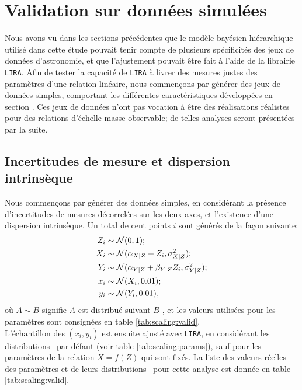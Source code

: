 \section{Validation sur données simulées}
\label{sec:scaling:valid}

Nous avons vu dans les sections précédentes que le modèle bayésien hiérarchique utilisé dans cette étude pouvait tenir compte de plusieurs spécificités des jeux de données d'astronomie, et que l'ajustement pouvait être fait à l'aide de la librairie \texttt{LIRA}.
Afin de tester la capacité de \texttt{LIRA} à livrer des mesures justes des paramètres d'une relation linéaire, nous commençons par générer des jeux de données simples, comportant les différentes caractéristiques développées en section .
Ces jeux de données n'ont pas vocation à être des réalisations réalistes pour des relations d'échelle masse-observable; de telles analyses seront présentées par la suite.

\subsection{Incertitudes de mesure et dispersion intrinsèque}
\label{sec:scaling:valid1}

Nous commençons par générer des données simples, en considérant la présence d'incertitudes de mesures décorrelées sur les deux axes, et l'existence d'une dispersion intrinsèque.
Un total de cent points $i$ sont générés de la façon suivante:
\begin{align}
    \nonumber Z_i &\sim \mathcal{N}(0, 1); \\
    \nonumber X_i &\sim \mathcal{N}(\alpha_{X|Z} + Z_i, \sigma_{X|Z}^2); \\
    \nonumber Y_i &\sim \mathcal{N}(\alpha_{Y|Z} + \beta_{Y|Z} Z_i, \sigma_{Y|Z}^2); \\
    \nonumber x_i &\sim \mathcal{N}(X_i, 0.01); \\
              y_i &\sim \mathcal{N}(Y_i, 0.01),
              \label{eq:scaling:sim_sample_valid}
\end{align}
où $A \sim B$ signifie \guillemotleft $A$ est distribué suivant $B$ \guillemotright, et les valeurs utilisées pour les paramètres sont consignées en table \ref{tab:scaling:valid}. \\
L'échantillon des $(x_i, y_i)$ est ensuite ajusté avec \texttt{LIRA}, en considérant les distributions \prior\ par défaut (voir table \ref{tab:scaling:params}), sauf pour les paramètres de la relation $X = f(Z)$ qui sont fixés.
La liste des valeurs réelles des paramètres et de leurs distributions \prior\ pour cette analyse est donnée en table \ref{tab:scaling:valid}.


